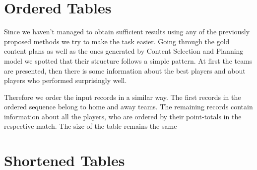 \begin{table}[h]
    \centering
    \caption{Performance metrics on the joint-copy model with content selection encoder.} \label{table:metrics_csap}
\end{table}

\section{Ordered Tables}

Since we haven't managed to obtain sufficient results using any of the previously proposed methods we try to make the task easier. Going through the gold content plans as well as the ones generated by Content Selection and Planning model we spotted that their structure follows a simple pattern. At first the teams are presented, then there is some information about the best players and about players who performed surprisingly well.

Therefore we order the input records in a similar way. The first records in the ordered sequence belong to home and away teams. The remaining records contain information about all the players, who are ordered by their point-totals in the respective match. The size of the table remains the same 

\section{Shortened Tables}

